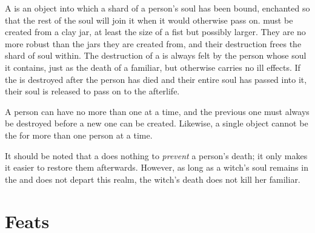 A {\phylactery} is an object into which a shard of a person's soul has been bound, enchanted so that the rest of the soul will join it when it would otherwise pass on.
{\phylacteries} must be created from a clay jar, at least the size of a fist but possibly larger.
They are no more robust than the jars they are created from, and their destruction frees the shard of soul within.
The destruction of a {\phylactery} is always felt by the person whose soul it contains, just as the death of a familiar, but otherwise carries no ill effects.
If the {\phylactery} is destroyed after the person has died and their entire soul has passed into it, their soul is released to pass on to the afterlife.

A person can have no more than one {\phylactery} at a time, and the previous one must always be destroyed before a new one can be created.
Likewise, a single object cannot be the {\phylactery} for more than one person at a time.

It should be noted that a {\phylactery} does nothing to \emph{prevent} a person's death; it only makes it easier to restore them afterwards.
However, as long as a witch's soul remains in the {\phylactery} and does not depart this realm, the witch's death does not kill her familiar.

\section{Feats}



